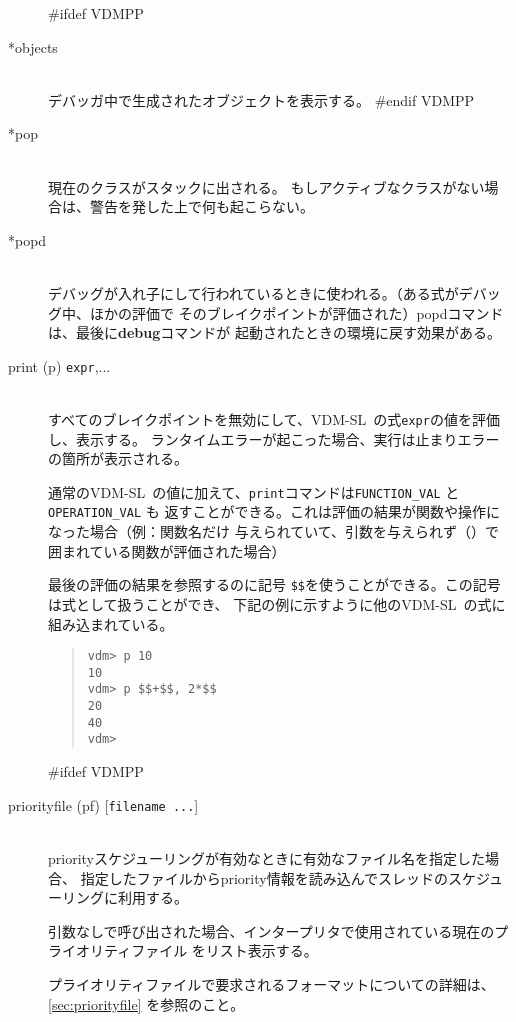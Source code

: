 \documentclass[\pformat,12pt]{article}
\newcommand{\vdmslpp}{VDM-SL}
\newcommand{\vdmslpp}{VDM++}
\begin{document}
\begin{description}
#ifdef VDMPP
\item[*objects] \mbox{}\\
  デバッガ中で生成されたオブジェクトを表示する。
#endif VDMPP

\item[*pop] \mbox{}\\
  現在のクラスがスタックに出される。
  もしアクティブなクラスがない場合は、警告を発した上で何も起こらない。

\item[*popd] \mbox{}\\
  デバッグが入れ子にして行われているときに使われる。（ある式がデバッグ中、ほかの評価で
  そのブレイクポイントが評価された）popdコマンドは、最後に\textbf{debug}コマンドが
  起動されたときの環境に戻す効果がある。
 
\item[print (p) {\tt expr},...] \mbox{}\\
  すべてのブレイクポイントを無効にして、\vdmslpp\ の式{\tt expr}の値を評価し、表示する。
  ランタイムエラーが起こった場合、実行は止まりエラーの箇所が表示される。

   通常の\vdmslpp\ の値に加えて、{\tt print}コマンドは{\tt FUNCTION\_VAL}  と{\tt OPERATION\_VAL} も
  返すことができる。これは評価の結果が関数や操作になった場合（例：関数名だけ
  与えられていて、引数を与えられず（）で囲まれている関数が評価された場合）
  
  最後の評価の結果を参照するのに記号 {\tt \$\$}を使うことができる。この記号は式として扱うことができ、
  下記の例に示すように他の\vdmslpp\ の式に組み込まれている。

\begin{quote}
\begin{verbatim}
vdm> p 10
10
vdm> p $$+$$, 2*$$
20
40
vdm> 
\end{verbatim}
\end{quote}

#ifdef VDMPP
\item[priorityfile (pf) \mbox{[{\tt filename ...}]}] \mbox{}\\
  priorityスケジューリングが有効なときに有効なファイル名を指定した場合、
  指定したファイルからpriority情報を読み込んでスレッドのスケジューリングに利用する。
  
  引数なしで呼び出された場合、インタープリタで使用されている現在のプライオリティファイル
  をリスト表示する。

  プライオリティファイルで要求されるフォーマットについての詳細は、\ref{sec:priorityfile} 
  を参照のこと。


\end{description}
\end{document}
